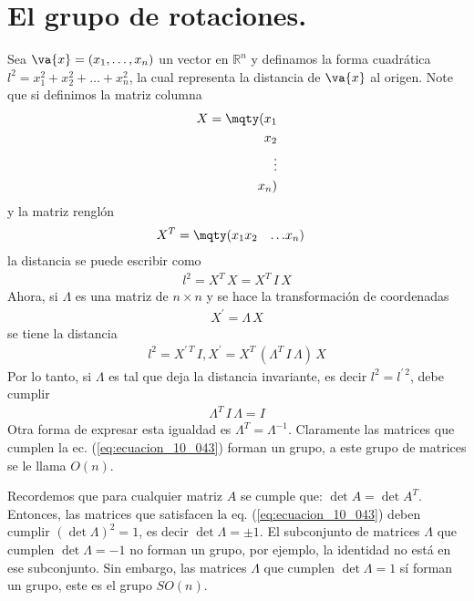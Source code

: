 \section{El grupo de rotaciones.}
Sea $\va{x} = (x_{1}, \ldots, x_{n})$ un vector en $\mathbb{R}^{n}$ y definamos la forma cuadrática $l^{2} = x_{1}^{2} + x_{2}^{2} + \ldots + x_{n}^{2}$, la cual representa la distancia de $\va{x}$ al origen. Note que si definimos la matriz columna
\begin{align}
X = \mqty(x_{1} \\ x_{2} \\ \vdots \\ x_{n})
\label{eq:ecuacion_10_038}
\end{align}
y la matriz renglón
\begin{align}
X^{T} = \mqty(x_{1} & x_{2} & \ldots & x_{n})
\label{eq:ecuacion_10_039}
\end{align}
la distancia se puede escribir como
\begin{align}
l^{2} = X^{T} \, X = X^{T} \, I \, X 
\label{eq:ecuacion_10_040}
\end{align}
Ahora, si $\Lambda$ es una matriz de $n \times n$ y se hace la transformación de coordenadas
\begin{align}
X^{\prime} = \Lambda \, X
\label{eq:ecuacion_10_041}
\end{align}
se tiene la distancia
\begin{align}
l^{2} = X^{\prime \, T} \, I , X^{\prime} = X^{T} \, \left( \Lambda^{T} \, I \, \Lambda \right) \, X 
\label{eq:ecuacion_10_042}
\end{align}
Por lo tanto, si $\Lambda$ es tal que deja la distancia invariante, es decir $l^{2} = l^{\prime \, 2}$, debe cumplir
\begin{align}
\Lambda^{T} \, I \, \Lambda = I
\label{eq:ecuacion_10_043}
\end{align}
Otra forma de expresar esta igualdad es $\Lambda^{T} = \Lambda^{-1}$. Claramente las matrices que cumplen la ec. (\ref{eq:ecuacion_10_043}) forman un grupo, a este grupo de matrices se le llama $O(n)$.
\par
Recordemos que para cualquier matriz $A$ se cumple que: $\det A = \det A^{T}$. Entonces, las matrices que satisfacen la eq. (\ref{eq:ecuacion_10_043}) deben cumplir $(\det \Lambda)^{2} = 1$, es decir $\det \Lambda = \pm 1$. El subconjunto de matrices $\Lambda$ que cumplen $\det \Lambda = - 1$ no forman un grupo, por ejemplo, la identidad no está en ese subconjunto. Sin embargo, las matrices $\Lambda$ que cumplen $\det \Lambda = 1$ sí forman un grupo, este es el grupo $SO(n)$.
